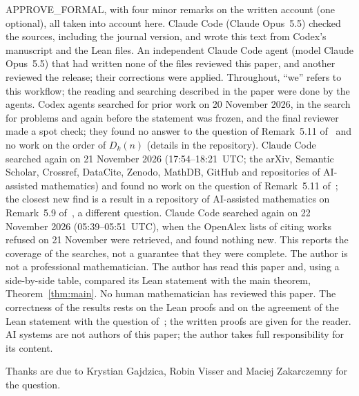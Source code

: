 \documentclass[11pt]{article}
\theoremstyle{definition}
\theoremstyle{remark}
\begin{document}
APPROVE\_FORMAL, with four minor remarks on the written account (one
optional), all taken into account here. Claude Code (Claude Opus~5.5) checked
the sources, including the journal version, and wrote this text from Codex's
manuscript and the Lean files. An independent Claude Code agent (model Claude Opus~5.5) that had written none of the files reviewed this paper, and another reviewed the release; their corrections were applied. Throughout, ``we'' refers to
this workflow; the reading and searching described in the paper were done by
the agents. Codex agents searched for prior work on 20 November 2026, in the
search for problems and again before the statement was frozen, and the final
reviewer made a spot check; they found no answer to the question of
Remark~5.11 of~\cite{gvz} and no work on the order of $D_k(n)$ (details in the
repository). Claude Code searched again on 21 November 2026 (17:54--18:21~UTC; the arXiv, Semantic Scholar, Crossref, DataCite, Zenodo, MathDB, GitHub and repositories of AI-assisted mathematics) and found no work on the question of Remark~5.11 of~\cite{gvz}; the closest new find is a result in a repository of AI-assisted mathematics on Remark~5.9 of~\cite{gz1}, a different question. Claude Code searched again on 22 November 2026 (05:39--05:51~UTC), when the OpenAlex lists of citing works refused on 21 November were retrieved, and found nothing new. This reports the coverage of the searches,
not a guarantee that they were complete. The author is not a professional
mathematician. The author has read this paper and, using a side-by-side table, compared its Lean statement with the main theorem, Theorem~\ref{thm:main}. No human mathematician has reviewed this paper.
The correctness of the results rests on the Lean proofs and on the agreement
of the Lean statement with the question of~\cite{gvz}; the written proofs are
given for the reader. AI systems are not authors of this paper; the author
takes full responsibility for its content.

\medskip
\noindent Thanks are due to Krystian Gajdzica, Robin Visser and Maciej
Zakarczemny for the question.
\end{document}
